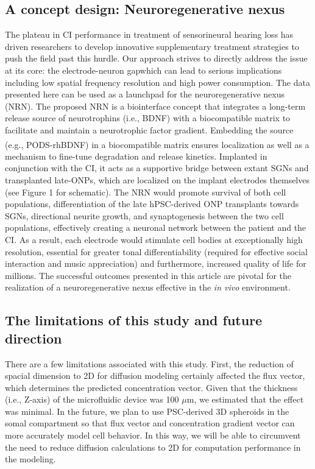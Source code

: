 \documentclass[review]{elsarticle}
\begin{document}
\subsection{A concept design: Neuroregenerative nexus}
The plateau in CI performance in treatment of sensorineural hearing loss has driven researchers to develop innovative supplementary treatment strategies to push the field past this hurdle. Our approach strives to directly address the issue at its core: the electrode-neuron gap\textendash which can lead to serious implications including low spatial frequency resolution and high power consumption. The data presented here can be used as a launchpad for the neuroregenerative nexus (NRN). The proposed NRN is a biointerface concept that integrates a long-term release source of neurotrophins (i.e., BDNF) with a biocompatible matrix to facilitate and maintain a neurotrophic factor gradient. Embedding the source (e.g., PODS\textsuperscript{\textregistered}-rhBDNF) in a biocompatible matrix ensures localization as well as a mechanism to fine-tune degradation and release kinetics. Implanted in conjunction with the CI, it acts as a supportive bridge between extant SGNs and transplanted late-ONPs, which are localized on the implant electrodes themselves (see Figure 1 for schematic). The NRN would promote survival of both cell populations, differentiation of the late hPSC-derived ONP transplants towards SGNs, directional neurite growth, and synaptogenesis between the two cell populations, effectively creating a neuronal network between the patient and the CI. As a result, each electrode would stimulate cell bodies at exceptionally high resolution, essential for greater tonal differentiability (required for effective social interaction and music appreciation) and furthermore, increased quality of life for millions. The successful outcomes presented in this article are pivotal for the realization of a neuroregenerative nexus effective in the \textit{in vivo} environment. 

\subsection{The limitations of this study and future direction}
There are a few limitations associated with this study.  First, the reduction of spacial dimension to 2D  for diffusion modeling certainly affected the flux vector, which determines the predicted concentration vector. Given that the thickness (i.e., Z-axis) of the microfluidic device was 100 $\mu$m, we estimated that the effect was minimal. In the future, we plan to use PSC-derived 3D spheroids in the somal compartment so that flux vector and concentration gradient vector can more accurately model cell behavior. In this way, we will be able to circumvent the need to reduce diffusion calculations to 2D for computation performance in the modeling. 
\end{document}
